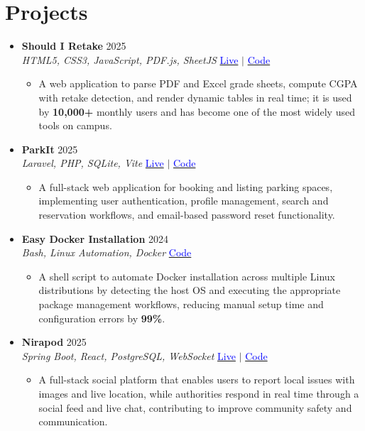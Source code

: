 \documentclass[a4paper]{article}
\newcommand{\resumeItem}[1]{
  \item\small{
    {#1 \vspace{-2pt}}
  }
}
\newcommand{\resumeItemListStart}{\begin{itemize}}
\newcommand{\resumeItemListEnd}{\end{itemize}\vspace{-5pt}}
\begin{document}
\section{Projects}
  \begin{itemize}[leftmargin=0.15in, label={}, itemsep=6pt]

    \item
    \textbf{Should I Retake} \hfill 2025\\
    \small\textit{HTML5, CSS3, JavaScript, PDF.js, SheetJS} \hfill
    \href{https://badhon495.github.io/should-i-retake/}{\textcolor{blue}{Live}} $|$
    \href{https://github.com/badhon495/should-i-retake}{\textcolor{blue}{Code}}\normalsize
    \vspace{-5pt}
    \resumeItemListStart
      \resumeItem{A web application to parse PDF and Excel grade sheets, compute CGPA with retake detection, and render dynamic tables in real time; it is used by \textbf{10,000+} monthly users and has become one of the most widely used tools on campus.
}
    \resumeItemListEnd

    \item
    \textbf{ParkIt} \hfill 2025\\
    \small\textit{Laravel, PHP, SQLite, Vite} \hfill
    \href{https://parkit-2arc.onrender.com/}{\textcolor{blue}{Live}} $|$
    \href{https://github.com/badhon495/ParkIt}{\textcolor{blue}{Code}}\normalsize
    \vspace{-5pt}
    \resumeItemListStart
      \resumeItem{A full-stack web application for booking and listing parking spaces, implementing user authentication, profile management, search and reservation workflows, and email-based password reset functionality.}
    \resumeItemListEnd

    \item
    \textbf{Easy Docker Installation} \hfill 2024\\
    \small\textit{Bash, Linux Automation, Docker} \hfill
    \href{https://github.com/badhon495/Easy_Docker_Installation}{\textcolor{blue}{Code}}\normalsize
    \vspace{-5pt}
    \resumeItemListStart
      \resumeItem{A shell script to automate Docker installation across multiple Linux distributions by detecting the host OS and executing the appropriate package management workflows, reducing manual setup time and configuration errors by \textbf{99\%}.}
    \resumeItemListEnd


        \item
    \textbf{Nirapod} \hfill 2025\\
    \small\textit{Spring Boot, React, PostgreSQL, WebSocket} \hfill
    \href{https://nirapod.netlify.app/}{\textcolor{blue}{Live}} $|$
    \href{https://github.com/badhon495/Nirapod}{\textcolor{blue}{Code}}\normalsize
    \vspace{-5pt}
    \resumeItemListStart
      \resumeItem{A full-stack social platform that enables users to report local issues with images and live location, while authorities respond in real time through a social feed and live chat, contributing to improve community safety and communication.}
    \resumeItemListEnd


\end{itemize}
\end{document}
